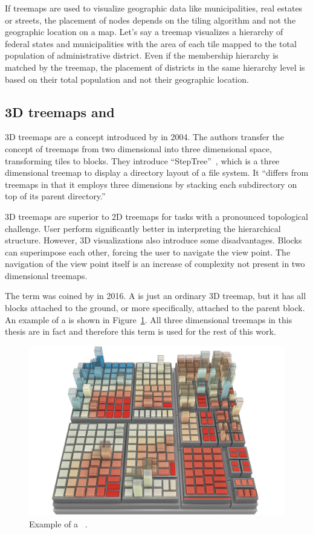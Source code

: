 If treemaps are used to visualize geographic data like municipalities, real estates or streets, the placement of nodes depends on the tiling algorithm and not the geographic location on a map.
Let's say a treemap visualizes a hierarchy of federal states and municipalities with the area of each tile mapped to the total population of administrative district.
Even if the membership hierarchy is matched by the treemap, the placement of districts in the same hierarchy level is based on their total population and not their geographic location.

\subsection{3D treemaps and \tmaps{}}
3D treemaps are a concept introduced by \textcite{Bladh2004} in 2004.
The authors transfer the concept of treemaps from two dimensional into three dimensional space, transforming tiles to blocks.
They introduce ``StepTree''~\parencite{Bladh2004}, which is a three dimensional treemap to display a directory layout of a file system.
It ``differs from treemaps in that it employs three dimensions by stacking each subdirectory on top of its parent directory.''

3D treemaps are superior to 2D treemaps for tasks with a pronounced topological challenge.
User perform significantly better in interpreting the hierarchical structure.
However, 3D visualizations also introduce some disadvantages.
Blocks can superimpose each other, forcing the user to navigate the view point.
The navigation of the view point itself is an increase of complexity not present in two dimensional treemaps.

The term \tmap{} was coined by \textcite{Limberger2016} in 2016.
A \tmap{} is just an ordinary 3D treemap, but it has all blocks attached to the ground, or more specifically, attached to the parent block.
An example of a \tmap{} is shown in Figure~\ref{fig:research:ua_treemap}.
All three dimensional treemaps in this thesis are in fact \tmaps{} and therefore this term is used for the rest of this work.

\begin{figure}
  \centering
  \includegraphics[width=\textwidth]{figures/related-work/2_5D_treemap_example}
  \caption{Example of a \tmap{}~\parencite{Doellner2017}.}
  \label{fig:research:ua_treemap}
\end{figure}

